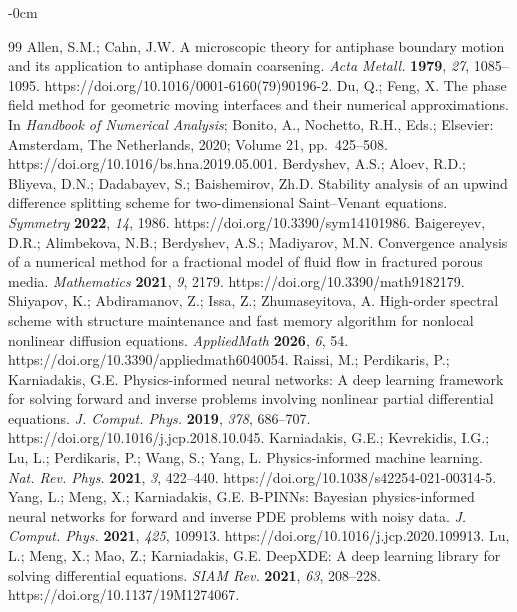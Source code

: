\begin{adjustwidth}{-\extralength}{0cm}

\begin{thebibliography}{99}
 Allen, S.M.; Cahn, J.W. A microscopic theory for antiphase boundary motion and its application to antiphase domain coarsening. \textit{Acta Metall.} \textbf{1979}, \textit{27}, 1085--1095. https://doi.org/10.1016/0001-6160(79)90196-2.
 Du, Q.; Feng, X. The phase field method for geometric moving interfaces and their numerical approximations. In \textit{Handbook of Numerical Analysis}; Bonito, A., Nochetto, R.H., Eds.; Elsevier: Amsterdam, The Netherlands, 2020; Volume 21, pp.\ 425--508. https://doi.org/10.1016/bs.hna.2019.05.001.
 Berdyshev, A.S.; Aloev, R.D.; Bliyeva, D.N.; Dadabayev, S.; Baishemirov, Zh.D. Stability analysis of an upwind difference splitting scheme for two-dimensional Saint--Venant equations. \textit{Symmetry} \textbf{2022}, \textit{14}, 1986. https://doi.org/10.3390/sym14101986.
 Baigereyev, D.R.; Alimbekova, N.B.; Berdyshev, A.S.; Madiyarov, M.N. Convergence analysis of a numerical method for a fractional model of fluid flow in fractured porous media. \textit{Mathematics} \textbf{2021}, \textit{9}, 2179. https://doi.org/10.3390/math9182179.
 Shiyapov, K.; Abdiramanov, Z.; Issa, Z.; Zhumaseyitova, A. High-order spectral scheme with structure maintenance and fast memory algorithm for nonlocal nonlinear diffusion equations. \textit{AppliedMath} \textbf{2026}, \textit{6}, 54. https://doi.org/10.3390/appliedmath6040054.
 Raissi, M.; Perdikaris, P.; Karniadakis, G.E. Physics-informed neural networks: A deep learning framework for solving forward and inverse problems involving nonlinear partial differential equations. \textit{J. Comput. Phys.} \textbf{2019}, \textit{378}, 686--707. https://doi.org/10.1016/j.jcp.2018.10.045.
 Karniadakis, G.E.; Kevrekidis, I.G.; Lu, L.; Perdikaris, P.; Wang, S.; Yang, L. Physics-informed machine learning. \textit{Nat. Rev. Phys.} \textbf{2021}, \textit{3}, 422--440. https://doi.org/10.1038/s42254-021-00314-5.
 Yang, L.; Meng, X.; Karniadakis, G.E. B-PINNs: Bayesian physics-informed neural networks for forward and inverse PDE problems with noisy data. \textit{J. Comput. Phys.} \textbf{2021}, \textit{425}, 109913. https://doi.org/10.1016/j.jcp.2020.109913.
 Lu, L.; Meng, X.; Mao, Z.; Karniadakis, G.E. DeepXDE: A deep learning library for solving differential equations. \textit{SIAM Rev.} \textbf{2021}, \textit{63}, 208--228. https://doi.org/10.1137/19M1274067.

\end{thebibliography}
\end{adjustwidth}

